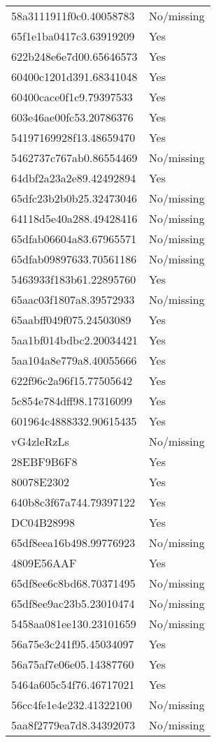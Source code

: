 \begin{tabular}{ll}
58a3111911f0c0.40058783 & No/missing \\
65f1e1ba0417c3.63919209 & Yes \\
622b248e6e7d00.65646573 & Yes \\
60400c1201d391.68341048 & Yes \\
60400cace0f1c9.79397533 & Yes \\
603e46ae00fc53.20786376 & Yes \\
54197169928f13.48659470 & Yes \\
5462737c767ab0.86554469 & No/missing \\
64dbf2a23a2e89.42492894 & Yes \\
65dfc23b2b0b25.32473046 & No/missing \\
64118d5e40a288.49428416 & No/missing \\
65dfab06604a83.67965571 & No/missing \\
65dfab09897633.70561186 & No/missing \\
5463933f183b61.22895760 & Yes \\
65aac03f1807a8.39572933 & No/missing \\
65aabff049f075.24503089 & Yes \\
5aa1bf014bdbc2.20034421 & Yes \\
5aa104a8e779a8.40055666 & Yes \\
622f96c2a96f15.77505642 & Yes \\
5c854e784dff98.17316099 & Yes \\
601964c4888332.90615435 & Yes \\
vG4zleRzLs & No/missing \\
28EBF9B6F8 & Yes \\
80078E2302 & Yes \\
640b8c3f67a744.79397122 & Yes \\
DC04B28998 & Yes \\
65df8eea16b498.99776923 & No/missing \\
4809E56AAF & Yes \\
65df8ee6c8bd68.70371495 & No/missing \\
65df8ee9ac23b5.23010474 & No/missing \\
5458aa081ee130.23101659 & No/missing \\
56a75e3c241f95.45034097 & Yes \\
56a75af7e06e05.14387760 & Yes \\
5464a605c54f76.46717021 & Yes \\
56cc4fe1e4e232.41322100 & No/missing \\
5aa8f2779ea7d8.34392073 & No/missing \\

\end{tabular}
